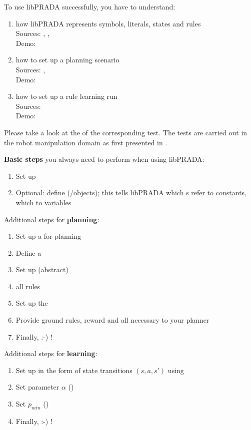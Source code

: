 \documentclass[10pt,twoside,twocolumn,fleqn]{article}
\begin{document}
To use libPRADA successfully, you have to understand:
\begin{enumerate}
\item how libPRADA represents symbols, literals, states and rules \\
Sources: , ,
 \\
Demo: 

\item  how to set up a planning scenario \\
Sources: ,  \\
Demo: 

\item how to set up a rule learning run \\
Sources:  \\
Demo: 
\end{enumerate}
Please take a look at the  of the corresponding test.  The
tests are carried out in the robot manipulation domain as first
presented in \cite{lang-toussaint-10jair}.

\textbf{Basic steps} you always need to perform when using libPRADA:
\begin{enumerate}
\item Set up 
\item Optional: define  (/objects); this tells libPRADA
which s refer to constants, which to variables
\end{enumerate}

Additional steps for \textbf{planning}:
\begin{enumerate}
\item Set up a  for planning
\item Define a 
\item Set up (abstract) 
\item {} all rules
\item Set up the 
\item Provide ground rules, reward and all necessary  to
your planner
\item Finally,  :-) !
\end{enumerate}

Additional steps for \textbf{learning}:
\begin{enumerate}
\item Set up  in the form of state transitions $(s,a,s')$ using

\item Set  parameter $\alpha$ ()

\item Set  $p_{min}$ ()

\item Finally,  :-) !
\end{enumerate}
\end{document}
